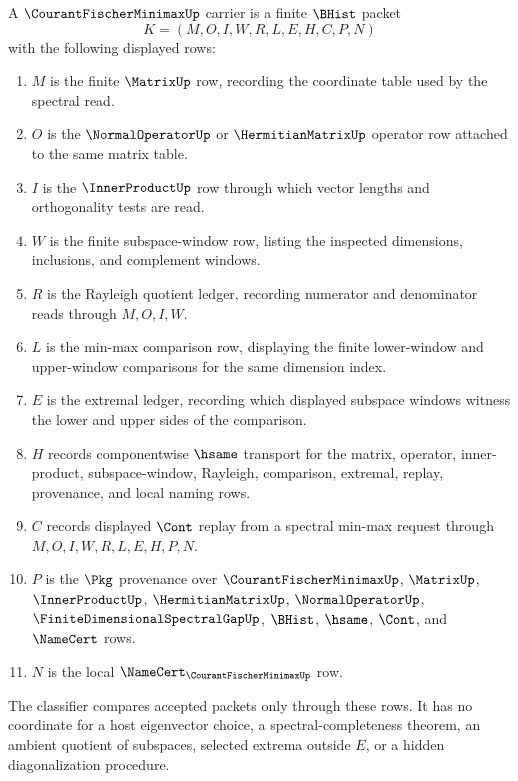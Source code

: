 \begin{definition}
\label{def:courant-fischer-minimax-carrier}
A $\CourantFischerMinimaxUp$ carrier is a finite $\BHist$ packet
$$
K=(M,O,I,W,R,L,E,H,C,P,N)
$$
with the following displayed rows:
\begin{enumerate}
\item $M$ is the finite $\MatrixUp$ row, recording the coordinate table used by the spectral read.
\item $O$ is the $\NormalOperatorUp$ or $\HermitianMatrixUp$ operator row attached to the same matrix table.
\item $I$ is the $\InnerProductUp$ row through which vector lengths and orthogonality tests are read.
\item $W$ is the finite subspace-window row, listing the inspected dimensions, inclusions, and complement windows.
\item $R$ is the Rayleigh quotient ledger, recording numerator and denominator reads through $M,O,I,W$.
\item $L$ is the min-max comparison row, displaying the finite lower-window and upper-window comparisons for the same dimension index.
\item $E$ is the extremal ledger, recording which displayed subspace windows witness the lower and upper sides of the comparison.
\item $H$ records componentwise $\hsame$ transport for the matrix, operator, inner-product, subspace-window, Rayleigh, comparison, extremal, replay, provenance, and local naming rows.
\item $C$ records displayed $\Cont$ replay from a spectral min-max request through $M,O,I,W,R,L,E,H,P,N$.
\item $P$ is the $\Pkg$ provenance over $\CourantFischerMinimaxUp$, $\MatrixUp$, $\InnerProductUp$, $\HermitianMatrixUp$, $\NormalOperatorUp$, $\FiniteDimensionalSpectralGapUp$, $\BHist$, $\hsame$, $\Cont$, and $\NameCert$ rows.
\item $N$ is the local $\NameCert_{\CourantFischerMinimaxUp}$ row.
\end{enumerate}
The classifier compares accepted packets only through these rows. It has no coordinate for a host eigenvector choice, a spectral-completeness theorem, an ambient quotient of subspaces, selected extrema outside $E$, or a hidden diagonalization procedure.
\end{definition}

